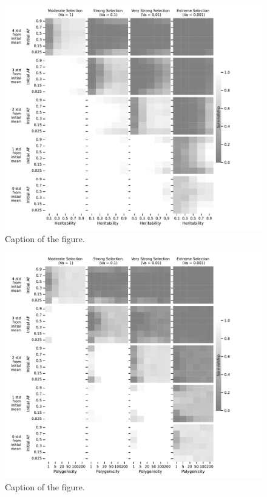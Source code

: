 \documentclass{article}
\begin{document}
\begin{figure}[b]
    \centering
    \includegraphics[width=1\textwidth]{figures/survivalship_forpoly-1.pdf}
    \caption{Caption of the figure.}
    \label{fig:survivalship_forpoly}
\end{figure}



\begin{figure}[b]
    \centering
    \includegraphics[width=1\textwidth]{figures/survivalshipforh2-1.pdf}
    \caption{Caption of the figure.}
    \label{fig:survivalshipforh2}
\end{figure}
\end{document}
